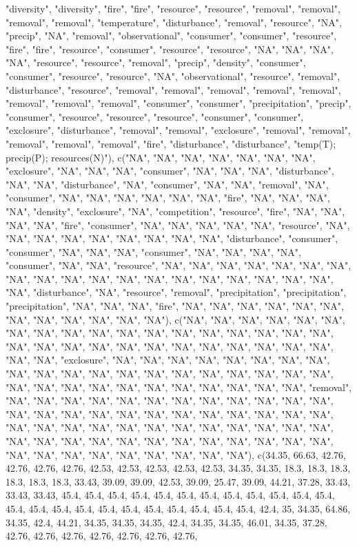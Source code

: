\documentclass{article}\usepackage[]{graphicx}\usepackage[]{color}
\begin{document}
"diversity", "diversity", "fire", "fire", "resource", "resource", "removal", "removal", "removal", "removal", "temperature", "disturbance", "removal", "resource", "NA", "precip", "NA", "removal", "observational", "consumer", "consumer", "resource", "fire", "fire", "resource", "consumer", "resource", "resource", "NA", "NA", "NA", "NA", "resource", "resource", "removal", "precip", "density", "consumer", "consumer", "resource", "resource", "NA", "observational", "resource", "removal", "disturbance", 
"resource", "removal", "removal", "removal", "removal", "removal", "removal", "removal", "removal", "consumer", "consumer", "precipitation", "precip", "consumer", "resource", "resource", "resource", "consumer", "consumer", "exclosure", "disturbance", "removal", "removal", "exclosure", "removal", "removal", "removal", "removal", "removal", "fire", "disturbance", "disturbance", "temp(T); precip(P); resources(N)"), c("NA", "NA", "NA", "NA", "NA", "NA", "NA", "exclosure", "NA", "NA", "NA", "consumer", "NA", "NA", "NA", "disturbance", "NA", "NA", "disturbance", "NA", "consumer", "NA", "NA", "removal", "NA", "consumer", "NA", "NA", "NA", "NA", "NA", "NA", "fire", "NA", "NA", "NA", "NA", "density", "exclosure", "NA", "competition", "resource", "fire", "NA", "NA", "NA", "NA", "fire", "consumer", "NA", "NA", "NA", "NA", "NA", "resource", "NA", "NA", "NA", "NA", "NA", "NA", "NA", "NA", "NA", "disturbance", "consumer", 
"consumer", "NA", "NA", "NA", "consumer", "NA", "NA", "NA", "NA", "consumer", "NA", "NA", "resource", "NA", "NA", "NA", "NA", "NA", "NA", "NA", "NA", "NA", "NA", "NA", "NA", "NA", "NA", "NA", "NA", "NA", "NA", "NA", "NA", "disturbance", "NA", "resource", "removal", "precipitation", "precipitation", "precipitation", "NA", "NA", "NA", "fire", "NA", "NA", "NA", "NA", "NA", "NA", "NA", "NA", "NA", "NA", "NA", "NA"), c("NA", "NA", "NA", "NA", "NA", "NA", "NA", "NA", "NA", "NA", "NA", "NA", "NA", "NA", "NA", "NA", "NA", "NA", "NA", "NA", "NA", "NA", "NA", "NA", "NA", "NA", "NA", "NA", "NA", "NA", "NA", "NA", "exclosure", "NA", "NA", "NA", "NA", "NA", "NA", "NA", "NA", "NA", "NA", "NA", "NA", "NA", "NA", "NA", "NA", "NA", "NA", "NA", "NA", "NA", "NA", "NA", "NA", "NA", "NA", "NA", "NA", "NA", "NA", "NA", "removal", "NA", "NA", "NA", "NA", "NA", "NA", "NA", "NA", "NA", "NA", "NA", "NA", "NA", "NA", "NA", "NA", "NA", 
"NA", "NA", "NA", "NA", "NA", "NA", "NA", "NA", "NA", "NA", "NA", "NA", "NA", "NA", "NA", "NA", "NA", "NA", "NA", "NA", "NA", "NA", "NA", "NA", "NA", "NA", "NA", "NA", "NA", "NA", "NA", "NA", "NA", "NA", "NA", "NA", "NA", "NA", "NA", "NA"), c(34.35, 66.63, 42.76, 42.76, 42.76, 42.76, 42.53, 42.53, 42.53, 42.53, 42.53, 34.35, 34.35, 18.3, 18.3, 18.3, 18.3, 18.3, 18.3, 33.43, 39.09, 39.09, 42.53, 39.09, 25.47, 39.09, 44.21, 37.28, 33.43, 33.43, 33.43, 45.4, 45.4, 45.4, 45.4, 45.4, 45.4, 45.4, 45.4, 45.4, 45.4, 45.4, 45.4, 45.4, 45.4, 45.4, 45.4, 45.4, 45.4, 45.4, 45.4, 45.4, 45.4, 45.4, 42.4, 35, 34.35, 64.86, 34.35, 42.4, 44.21, 34.35, 34.35, 34.35, 42.4, 34.35, 34.35, 46.01, 34.35, 37.28, 42.76, 42.76, 42.76, 42.76, 42.76, 42.76, 42.76, 
\end{document}
